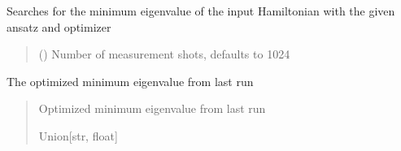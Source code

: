 \documentclass[letterpaper,10pt,english]{sphinxmanual}
\begin{document}
\begin{fulllineitems}
\begin{fulllineitems}
\begin{quote}
\begin{description}
\end{description}\end{quote}

\end{fulllineitems}


\begin{fulllineitems}
\label{\detokenize{qcompute_qapp.algorithm:qcompute_qapp.algorithm.VQE.run}}
\pysigstartsignatures
{}
\pysigstopsignatures
\sphinxAtStartPar
Searches for the minimum eigenvalue of the input Hamiltonian with the given ansatz and optimizer
\begin{quote}\begin{description}
\sphinxAtStartPar
{} () \textendash{} Number of measurement shots, defaults to 1024

\end{description}\end{quote}

\end{fulllineitems}


\begin{fulllineitems}
\label{\detokenize{qcompute_qapp.algorithm:qcompute_qapp.algorithm.VQE.minimum_eigenvalue}}
\pysigstartsignatures
{}
\pysigstopsignatures
\sphinxAtStartPar
The optimized minimum eigenvalue from last run
\begin{quote}\begin{description}
\sphinxAtStartPar
Optimized minimum eigenvalue from last run

\sphinxAtStartPar
Union{[}str, float{]}


\end{description}
\end{quote}
\end{fulllineitems}
\end{fulllineitems}
\end{document}
